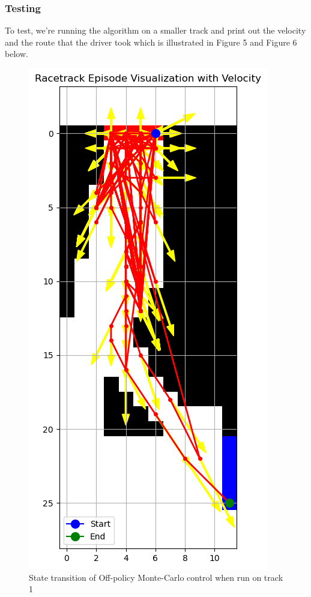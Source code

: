 \documentclass{article}
\begin{document}
\subsubsection{Testing}
To test, we're running the algorithm on a smaller track and print out the 
velocity and the route that the driver took which is illustrated in Figure 5 and
Figure 6 below. 

\begin{figure}[h!]
\centering
\includegraphics[scale=0.9]{./images/mc_test_racetrack1.png}
\caption{State transition of Off-policy Monte-Carlo control when run on track 1}
\label{fig:mc_test_racetrack1}
\end{figure}
\end{document}
